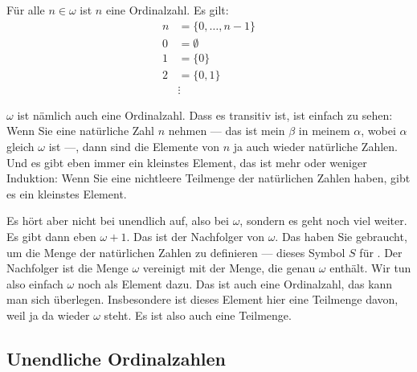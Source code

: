 \begin{math-stroke}
\begin{remark}
Für alle $n \in \omega$ ist $n$ eine Ordinalzahl. Es gilt:
\begin{align*}
n &= \{0, \dots, n-1\} \\
0 &= \emptyset \\
1 &= \{0\} \\
2 &= \{0, 1\} \\
&\vdots
\end{align*}
\end{remark}
\end{math-stroke}

\begin{spoken-clean}[00:33:09 - 00:34:45]
$\omega$ ist nämlich auch eine Ordinalzahl. Dass es transitiv ist, ist einfach zu sehen: Wenn Sie eine natürliche Zahl $n$ nehmen --- das ist mein $\beta$ in meinem $\alpha$, wobei $\alpha$ gleich $\omega$ ist ---, dann sind die Elemente von $n$ ja auch wieder natürliche Zahlen. Und es gibt eben immer ein kleinstes Element, das ist mehr oder weniger Induktion: Wenn Sie eine nichtleere Teilmenge der natürlichen Zahlen haben, gibt es ein kleinstes Element.

Es hört aber nicht bei unendlich auf, also bei $\omega$, sondern es geht noch viel weiter. Es gibt dann eben $\omega + 1$. Das ist der Nachfolger von $\omega$. Das haben Sie gebraucht, um die Menge der natürlichen Zahlen zu definieren --- dieses Symbol $S$ für . Der Nachfolger ist die Menge $\omega$ vereinigt mit der Menge, die genau $\omega$ enthält. Wir tun also einfach $\omega$ noch als Element dazu. Das ist auch eine Ordinalzahl, das kann man sich überlegen. Insbesondere ist dieses Element hier eine Teilmenge davon, weil ja da wieder $\omega$ steht. Es ist also auch eine Teilmenge.
\end{spoken-clean}

\subsection{Unendliche Ordinalzahlen}

